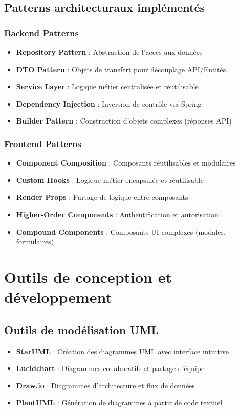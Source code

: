 \documentclass[12pt,a4paper]{report}
\begin{document}
\subsection{Patterns architecturaux implémentés}

\subsubsection{Backend Patterns}
\begin{itemize}
\item \textbf{Repository Pattern} : Abstraction de l'accès aux données
\item \textbf{DTO Pattern} : Objets de transfert pour découplage API/Entités
\item \textbf{Service Layer} : Logique métier centralisée et réutilisable
\item \textbf{Dependency Injection} : Inversion de contrôle via Spring
\item \textbf{Builder Pattern} : Construction d'objets complexes (réponses API)
\end{itemize}

\subsubsection{Frontend Patterns}
\begin{itemize}
\item \textbf{Component Composition} : Composants réutilisables et modulaires
\item \textbf{Custom Hooks} : Logique métier encapsulée et réutilisable
\item \textbf{Render Props} : Partage de logique entre composants
\item \textbf{Higher-Order Components} : Authentification et autorisation
\item \textbf{Compound Components} : Composants UI complexes (modales, formulaires)
\end{itemize}

\section{Outils de conception et développement}

\subsection{Outils de modélisation UML}
\begin{itemize}
\item \textbf{StarUML} : Création des diagrammes UML avec interface intuitive
\item \textbf{Lucidchart} : Diagrammes collaboratifs et partage d'équipe
\item \textbf{Draw.io} : Diagrammes d'architecture et flux de données
\item \textbf{PlantUML} : Génération de diagrammes à partir de code textuel
\end{itemize}
\end{document}
